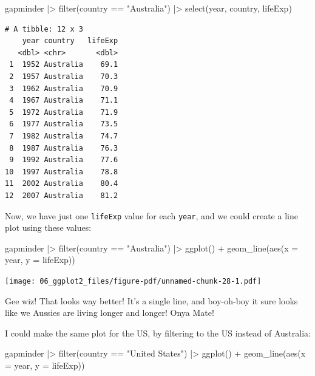 \documentclass[
  letterpaper,
  DIV=11,
  numbers=noendperiod]{scrreprt}
\newenvironment{Shaded}{\begin{snugshade}}{\end{snugshade}}
\newcommand{\AttributeTok}[1]{\textcolor[rgb]{0.40,0.45,0.13}{#1}}
\newcommand{\FunctionTok}[1]{\textcolor[rgb]{0.28,0.35,0.67}{#1}}
\newcommand{\NormalTok}[1]{\textcolor[rgb]{0.00,0.23,0.31}{#1}}
\newcommand{\SpecialCharTok}[1]{\textcolor[rgb]{0.37,0.37,0.37}{#1}}
\newcommand{\StringTok}[1]{\textcolor[rgb]{0.13,0.47,0.30}{#1}}
\begin{document}
\begin{Shaded}
\begin{Highlighting}[]
\NormalTok{gapminder }\SpecialCharTok{|\textgreater{}} 
  \FunctionTok{filter}\NormalTok{(country }\SpecialCharTok{==} \StringTok{"Australia"}\NormalTok{) }\SpecialCharTok{|\textgreater{}}
  \FunctionTok{select}\NormalTok{(year, country, lifeExp)}
\end{Highlighting}
\end{Shaded}

\begin{verbatim}
# A tibble: 12 x 3
    year country   lifeExp
   <dbl> <chr>       <dbl>
 1  1952 Australia    69.1
 2  1957 Australia    70.3
 3  1962 Australia    70.9
 4  1967 Australia    71.1
 5  1972 Australia    71.9
 6  1977 Australia    73.5
 7  1982 Australia    74.7
 8  1987 Australia    76.3
 9  1992 Australia    77.6
10  1997 Australia    78.8
11  2002 Australia    80.4
12  2007 Australia    81.2
\end{verbatim}

Now, we have just one \texttt{lifeExp} value for each \texttt{year}, and
we could create a line plot using these values:

\begin{Shaded}
\begin{Highlighting}[]
\NormalTok{gapminder }\SpecialCharTok{|\textgreater{}} 
  \FunctionTok{filter}\NormalTok{(country }\SpecialCharTok{==} \StringTok{"Australia"}\NormalTok{) }\SpecialCharTok{|\textgreater{}}
  \FunctionTok{ggplot}\NormalTok{() }\SpecialCharTok{+}
  \FunctionTok{geom\_line}\NormalTok{(}\FunctionTok{aes}\NormalTok{(}\AttributeTok{x =}\NormalTok{ year, }\AttributeTok{y =}\NormalTok{ lifeExp))}
\end{Highlighting}
\end{Shaded}

\texttt{[image: 06\_ggplot2\_files/figure-pdf/unnamed-chunk-28-1.pdf]}

Gee wiz! That looks way better! It's a single line, and boy-oh-boy it
sure looks like we Aussies are living longer and longer! Onya Mate!

I could make the same plot for the US, by filtering to the US instead of
Australia:

\begin{Shaded}
\begin{Highlighting}[]
\NormalTok{gapminder }\SpecialCharTok{|\textgreater{}} 
  \FunctionTok{filter}\NormalTok{(country }\SpecialCharTok{==} \StringTok{"United States"}\NormalTok{) }\SpecialCharTok{|\textgreater{}}
  \FunctionTok{ggplot}\NormalTok{() }\SpecialCharTok{+}
  \FunctionTok{geom\_line}\NormalTok{(}\FunctionTok{aes}\NormalTok{(}\AttributeTok{x =}\NormalTok{ year, }\AttributeTok{y =}\NormalTok{ lifeExp))}
\end{Highlighting}
\end{Shaded}
\end{document}
